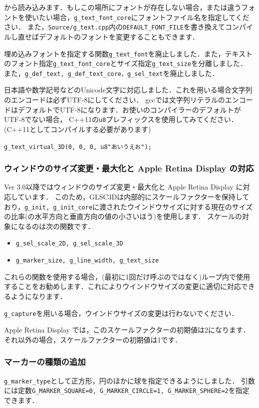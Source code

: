 \documentclass[a4paper,12pt]{jsarticle}%
\begin{document}
から読み込みます．もしこの場所にフォントが存在しない場合，または違うフォントを使いたい場合，\verb|g_text_font_core|にフォントファイル名を指定してください．
また，\verb|Source/g_text.cpp|内の\verb|DEFAULT_FONT_FILE|を書き換えてコンパイルし直せばデフォルトのフォントを変更することもできます．

埋め込みフォントを指定する関数\verb|g_text_font|を廃止しました．また，テキストのフォント指定\verb|g_text_font_core|とサイズ指定\verb|g_text_size|を分離しました．
また，\verb|g_def_text, g_def_text_core，g_sel_text|を廃止しました．

日本語や数学記号などのUnicode文字に対応しました．これを用いる場合文字列のエンコードは必ずUTF-8にしてください．
gccでは文字列リテラルのエンコードはデフォルトでUTF-8になります．お使いのコンパイラーのデフォルトがUTF-8でない場合，
C++11の\verb|u8|プレフィックスを使用してみてください．(C++11としてコンパイルする必要があります)
\begin{center}
\verb|g_text_virtual_3D(0, 0, 0, u8"あいうえお");|
\end{center}

\subsubsection{ウィンドウのサイズ変更・最大化と Apple Retina Display の対応}
Ver 3.0以降ではウィンドウのサイズ変更・最大化と Apple Retina Display に対応しています．
このため，GLSC3Dは内部的にスケールファクターを保持しており，\verb|g_init, g_init_core|に渡されたウインドウサイズに対する現在のサイズの比率(の水平方向と垂直方向の値の小さいほう)を使用します．
スケールの対象になるのは次の関数です．
\begin{itemize}
	\item \verb|g_sel_scale_2D, g_sel_scale_3D|
	\item \verb|g_marker_size, g_line_width, g_text_size|
\end{itemize}
これらの関数を使用する場合，(最初に1回だけ呼ぶのではなく)ループ内で使用することをお勧めします．これによりウインドウサイズの変更に適切に対応できるようになります．

\verb|g_capture|を用いる場合，ウインドウサイズの変更は行わないでください．

Apple Retina Display では，このスケールファクターの初期値は2になります．それ以外の場合，スケールファクターの初期値は1です．

\subsubsection{マーカーの種類の追加}
\verb|g_marker_type|として正方形，円のほかに球を指定できるようにしました．
引数には定数\verb|G_MARKER_SQUARE=0, G_MARKER_CIRCLE=1, G_MARKER_SPHERE=2|を指定できます．
\end{document}
